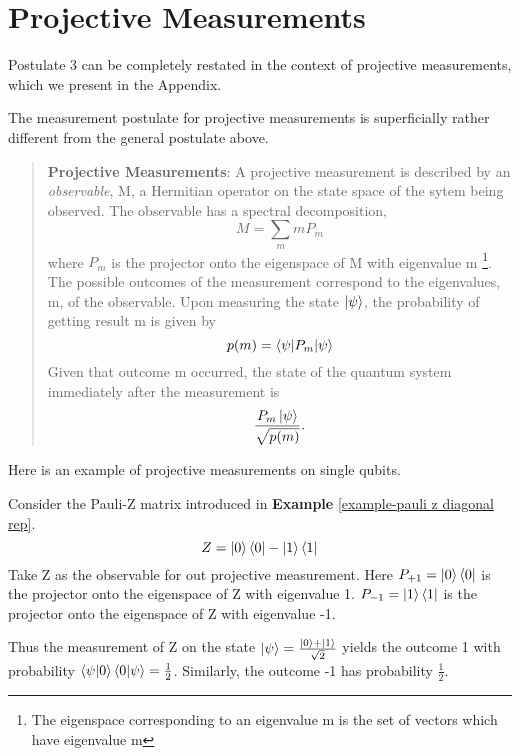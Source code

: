 
\chapter{Projective Measurements} %

\label{AppendixA} %
Postulate 3 can be completely restated in the context of projective measurements, which we present in the Appendix.




The measurement postulate for projective measurements is superficially rather different from the general postulate above.
\begin{quote}
    \textbf{Projective Measurements}: A projective measurement is described by an \textit{observable}, M, a Hermitian operator on the state space of the sytem being observed. The observable has a spectral decomposition,
    \begin{equation}
        M=\sum_m m P_m
    \end{equation}
    where $P_m$ is the projector onto the eigenspace of M with eigenvalue m \footnote{The eigenspace corresponding to an eigenvalue m is the set of vectors which have eigenvalue m}. The possible outcomes of the measurement correspond to the eigenvalues, m, of the observable. Upon measuring the state $\ket{\psi}$, the probability of getting result m is given by 
    \begin{equation}
        p(m)=\braket{\psi|P_m|\psi}
    \end{equation}
    Given that outcome m occurred, the state of the quantum system immediately after the measurement is 
    \begin{equation}
        \frac{P_m \ket{\psi}}{\sqrt{p(m)}}.
    \end{equation}
\end{quote}

Here is an example of projective measurements on single qubits.
\begin{example}
Consider the Pauli-Z matrix introduced in \textbf{Example} \ref{example-pauli z diagonal rep}.
\begin{equation}
    Z=\ket{0}\bra{0}-\ket{1}\bra{1}
\end{equation}
Take Z as the observable for out projective measurement. Here $P_{+1}=\ket{0}\bra{0}$ is the projector onto the eigenspace of Z with eigenvalue 1. $P_{-1}=\ket{1}\bra{1}$ is the projector onto the eigenspace of Z with eigenvalue -1.

Thus the measurement of Z on the state $\ket{\psi}=\frac{\ket{0}+\ket{1}}{\sqrt{2}}$ yields the outcome 1 with probability $\braket{\psi|0}\braket{0|\psi}=\frac{1}{2}$. Similarly, the outcome -1 has probability $\frac{1}{2}$.
\end{example}

